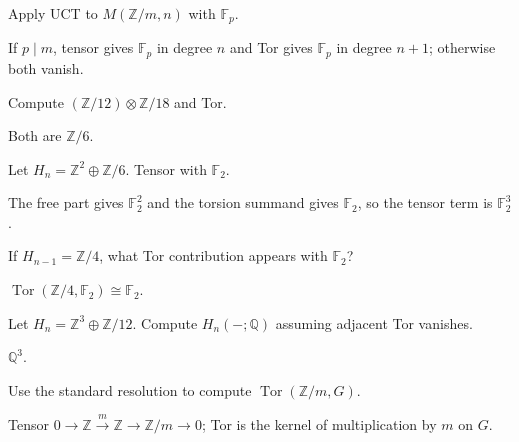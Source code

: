 \begin{problem}\label{prob:viii26-04}
Apply UCT to \(M(\mathbb Z/m,n)\) with \(\mathbb F_p\).
\end{problem}
\begin{solution}
If \(p\mid m\), tensor gives \(\mathbb F_p\) in degree \(n\) and Tor gives \(\mathbb F_p\) in degree \(n+1\); otherwise both vanish.
\end{solution}

\begin{problem}[Cyclic G]\label{prob:viii26-05}
Compute \((\mathbb Z/12)\otimes\mathbb Z/18\) and Tor.
\end{problem}
\begin{solution}
Both are \(\mathbb Z/6\).
\end{solution}

\begin{problem}\label{prob:viii26-06}
Let \(H_n=\mathbb Z^2\oplus\mathbb Z/6\). Tensor with \(\mathbb F_2\).
\end{problem}
\begin{solution}
The free part gives \(\mathbb F_2^2\) and the torsion summand gives \(\mathbb F_2\), so the tensor term is \(\mathbb F_2^3\).
\end{solution}

\begin{problem}\label{prob:viii26-07}
If \(H_{n-1}=\mathbb Z/4\), what Tor contribution appears with \(\mathbb F_2\)?
\end{problem}
\begin{solution}
\(\operatorname{Tor}(\mathbb Z/4,\mathbb F_2)\cong\mathbb F_2\).
\end{solution}

\begin{problem}[Rationalization]\label{prob:viii26-08}
Let \(H_n=\mathbb Z^3\oplus\mathbb Z/12\). Compute \(H_n(-;\mathbb Q)\) assuming adjacent Tor vanishes.
\end{problem}
\begin{solution}
\(\mathbb Q^3\).
\end{solution}

\begin{problem}\label{prob:viii26-09}
Use the standard resolution to compute \(\operatorname{Tor}(\mathbb Z/m,G)\).
\end{problem}
\begin{solution}
Tensor \(0\to\mathbb Z\xrightarrow m\mathbb Z\to\mathbb Z/m\to0\); Tor is the kernel of multiplication by \(m\) on \(G\).
\end{solution}

